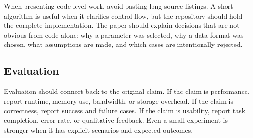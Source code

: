 When presenting code-level work, avoid pasting long source listings. A short algorithm is useful when it clarifies control flow, but the repository should hold the complete implementation. The paper should explain decisions that are not obvious from code alone: why a parameter was selected, why a data format was chosen, what assumptions are made, and which cases are intentionally rejected.

\subsection{Evaluation}

Evaluation should connect back to the original claim. If the claim is performance, report runtime, memory use, bandwidth, or storage overhead. If the claim is correctness, report success and failure cases. If the claim is usability, report task completion, error rate, or qualitative feedback. Even a small experiment is stronger when it has explicit scenarios and expected outcomes.
